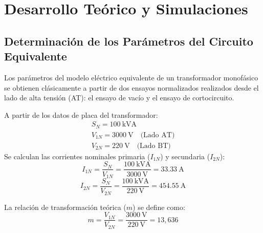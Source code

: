 \chapter{Desarrollo Teórico y Simulaciones}

\section{Determinación de los Parámetros del Circuito Equivalente}

Los parámetros del modelo eléctrico equivalente de un transformador monofásico se obtienen clásicamente a partir de dos
ensayos normalizados realizados desde el lado de alta tensión (AT): el ensayo de vacío y el ensayo de cortocircuito.

A partir de los datos de placa del transformador:
\begin{gather*}
    S_N = \SI{100}{\kilo\volt\ampere} \\
    V_{1N} = \SI{3000}{\volt} \quad \text{(Lado AT)} \\
    V_{2N} = \SI{220}{\volt} \quad \text{(Lado BT)}
\end{gather*}
Se calculan las corrientes nominales primaria ($I_{1N}$) y secundaria ($I_{2N}$):
\begin{equation*}
    I_{1N} = \frac{S_N}{V_{1N}} = \frac{\SI{100}{\kilo\volt\ampere}}{\SI{3000}{\volt}} = \SI{33,33}{\ampere}
\end{equation*}
\begin{equation*}
    I_{2N} = \frac{S_N}{V_{2N}} = \frac{\SI{100}{\kilo\volt\ampere}}{\SI{220}{\volt}} = \SI{454,55}{\ampere}
\end{equation*}

La relación de transformación teórica ($m$) se define como:
\begin{equation*}
    m = \frac{V_{1N}}{V_{2N}} = \frac{\SI{3000}{\volt}}{\SI{220}{\volt}} = 13,636
\end{equation*}

